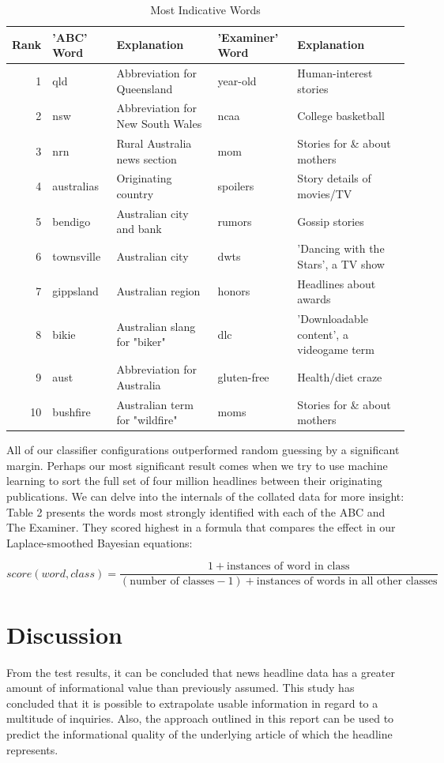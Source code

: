 \documentclass[format=acmlarge]{acmart}
\begin{document}
\begin{table}
  \caption{Most Indicative Words}
  \label{tab:two}
  \begin{tabular}{r|ll|ll}
    Rank & 'ABC' Word & Explanation & 'Examiner' Word & Explanation\\
    \hline
    1 & qld & Abbreviation for Queensland & year-old & Human-interest stories\\
    2 & nsw & Abbreviation for New South Wales & ncaa & College basketball\\
    3 & nrn & Rural Australia news section & mom & Stories for \& about mothers\\
    4 & australias & Originating country & spoilers & Story details of movies/TV\\
    5 & bendigo & Australian city and bank & rumors & Gossip stories\\
    6 & townsville & Australian city & dwts & 'Dancing with the Stars', a TV show\\
    7 & gippsland & Australian region & honors & Headlines about awards\\
    8 & bikie & Australian slang for "biker" & dlc & 'Downloadable content', a videogame term\\
    9 & aust & Abbreviation for Australia & gluten-free & Health/diet craze\\
    10 & bushfire & Australian term for "wildfire" & moms & Stories for \& about mothers\\
  \end{tabular}
\end{table}

All of our classifier configurations outperformed random guessing by a significant margin.  Perhaps our most significant result comes when we try to use machine learning to sort the full set of four million headlines between their originating publications.  We can delve into the internals of the collated data for more insight:  Table 2 presents the words most strongly identified with each of the ABC and The Examiner.  They scored highest in a formula that compares the effect in our Laplace-smoothed Bayesian equations:

$$score(word, class) = \frac{1 + \textrm{instances of word in class}}{(\textrm{number of classes} - 1) + \textrm{instances of words in all other classes}}$$

\section{Discussion}
From the test results, it can be concluded that news headline data has a greater amount of informational value than previously assumed.  This study has concluded that it is possible to extrapolate usable information in regard to a multitude of inquiries.  Also, the approach outlined in this report can be used to predict the informational quality of the underlying article of which the headline represents.
\end{document}

